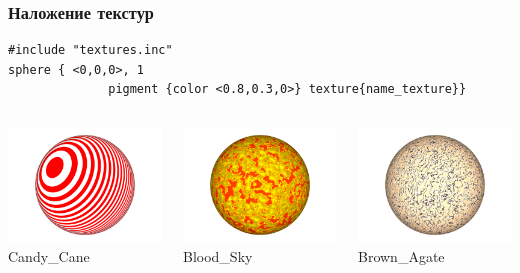\documentclass{beamer}
\begin{document}
\begin{frame}[fragile]
\frametitle{Наложение текстур}
\begin{verbatim}
#include "textures.inc"
sphere { <0,0,0>, 1 
			  pigment {color <0.8,0.3,0>} texture{name_texture}}
\end{verbatim}
\begin{columns}
	\begin{column}{4cm}	
		\includegraphics[width=4 cm]{moon_candy.png}
		\centering
		\\Candy\_Cane
	\end{column}
	\begin{column}{4cm}	
		\includegraphics[width=4 cm]{moon_Blood_Sky.png}
		\centering
		\\Blood\_Sky
	\end{column}
	\begin{column}{4cm}	
		\includegraphics[width=4 cm]{moon_Brown_Agate.png}
		\centering
		\\Brown\_Agate
	\end{column}
\end{columns}
\end{frame}

{
}
\end{document}
